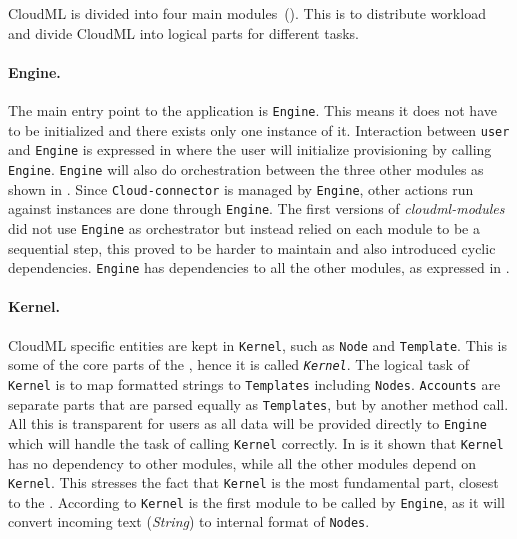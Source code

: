 
CloudML is divided into four main modules~().
This is to distribute workload and divide CloudML into logical parts for different tasks.

\paragraph{Engine.} 




The main entry point to the application is \texttt{Engine}. 
This means it does not have to be initialized and there exists only one instance of it.
Interaction between \texttt{user} and \texttt{Engine} is expressed in  
where the user will initialize provisioning by calling \texttt{Engine}.
\texttt{Engine} will also do orchestration between the three other modules
as shown in .
Since \texttt{Cloud-connector} is managed by \texttt{Engine},
other actions run against instances are done through \texttt{Engine}.
The first versions of \emph{cloudml-modules} did not use \texttt{Engine} as orchestrator but
instead relied on each module to be a sequential step, this proved to be harder to maintain
and also introduced cyclic dependencies.
\texttt{Engine} has dependencies to all the other modules,
as expressed in .

\paragraph{Kernel.} 

CloudML specific entities are kept in \texttt{Kernel},
such as \texttt{Node} and \texttt{Template}.
This is some of the core parts of the , hence it is called \emph{\texttt{Kernel}}.
The logical task of \texttt{Kernel} is to map  formatted strings to 
\texttt{Templates} including \texttt{Nodes}.
\texttt{Accounts} are separate parts that are parsed equally as \texttt{Templates},
 but by another method call. All this is transparent for users as all data will
be provided directly to \texttt{Engine} which will handle the task
of calling \texttt{Kernel} correctly.
In  is it shown that \texttt{Kernel}
has no dependency to other modules, while all the other modules depend on \texttt{Kernel}.
This stresses the fact that \texttt{Kernel} is the most fundamental part,
closest to the .
According to  \texttt{Kernel} is the first module
to be called by \texttt{Engine}, as it will convert incoming text (\emph{String})
to internal format of \texttt{Nodes}.

